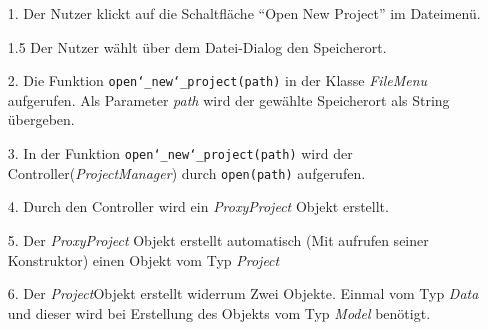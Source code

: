 \documentclass{article}
\begin{document}
\begin{enumerate}
    \item[1.] Der Nutzer klickt auf die Schaltfläche 
    \enquote{Open New Project} im Dateimenü.
    \item[1.5] Der Nutzer wählt über dem Datei-Dialog den Speicherort.  
    \item[2.] Die Funktion \texttt{open\char`_new\char`_project(path)} in der Klasse \textit{FileMenu} aufgerufen. Als Parameter \textit{path} wird der gewählte Speicherort als String übergeben.
    \item[3.] In der Funktion \texttt{open\char`_new\char`_project(path)} wird der Controller(\textit{ProjectManager}) durch \texttt{open(path)} aufgerufen.
    \item[4.] Durch den Controller wird ein \textit{ProxyProject} Objekt erstellt.
    \item[5.] Der \textit{ProxyProject} Objekt erstellt automatisch (Mit aufrufen seiner Konstruktor) einen Objekt vom Typ \textit{Project}
    \item[6.] Der \textit{Project}\textendash Objekt erstellt widerrum Zwei Objekte. Einmal vom Typ \textit{Data} und dieser wird bei Erstellung des Objekts vom Typ \textit{Model} benötigt. 
\end{enumerate}
\end{document}
